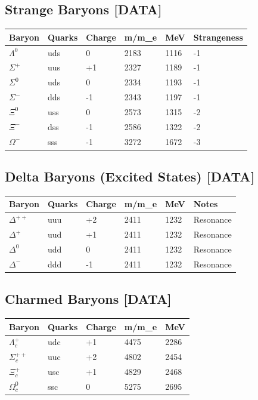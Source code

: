\documentclass[
  11pt,
  letterpaper,
  twoside,
  openany]{book}
\makeatletter
\let\orig@subsection\subsection
\renewcommand{\subsection}{\needspace{6\baselineskip}\orig@subsection}
\makeatother
\begin{document}
\subsection{Strange Baryons {[}DATA{]}}\label{strange-baryons-data}

\begin{longtable}[]{@{}llllll@{}}
\toprule\noalign{}
Baryon & Quarks & Charge & m/m\_e & MeV & Strangeness \\
\midrule\noalign{}
\endhead
\bottomrule\noalign{}
\endlastfoot
\(\Lambda^0\) & uds & 0 & 2183 & 1116 & -1 \\
\(\Sigma^+\) & uus & +1 & 2327 & 1189 & -1 \\
\(\Sigma^0\) & uds & 0 & 2334 & 1193 & -1 \\
\(\Sigma^-\) & dds & -1 & 2343 & 1197 & -1 \\
\(\Xi^0\) & uss & 0 & 2573 & 1315 & -2 \\
\(\Xi^-\) & dss & -1 & 2586 & 1322 & -2 \\
\(\Omega^-\) & sss & -1 & 3272 & 1672 & -3 \\
\end{longtable}

\subsection{Delta Baryons (Excited States)
{[}DATA{]}}\label{delta-baryons-excited-states-data}

\begin{longtable}[]{@{}llllll@{}}
\toprule\noalign{}
Baryon & Quarks & Charge & m/m\_e & MeV & Notes \\
\midrule\noalign{}
\endhead
\bottomrule\noalign{}
\endlastfoot
\(\Delta^{++}\) & uuu & +2 & 2411 & 1232 & Resonance \\
\(\Delta^+\) & uud & +1 & 2411 & 1232 & Resonance \\
\(\Delta^0\) & udd & 0 & 2411 & 1232 & Resonance \\
\(\Delta^-\) & ddd & -1 & 2411 & 1232 & Resonance \\
\end{longtable}

\subsection{Charmed Baryons {[}DATA{]}}\label{charmed-baryons-data}

\begin{longtable}[]{@{}lllll@{}}
\toprule\noalign{}
Baryon & Quarks & Charge & m/m\_e & MeV \\
\midrule\noalign{}
\endhead
\bottomrule\noalign{}
\endlastfoot
\(\Lambda_c^+\) & udc & +1 & 4475 & 2286 \\
\(\Sigma_c^{++}\) & uuc & +2 & 4802 & 2454 \\
\(\Xi_c^+\) & usc & +1 & 4829 & 2468 \\
\(\Omega_c^0\) & ssc & 0 & 5275 & 2695 \\
\end{longtable}
\end{document}

